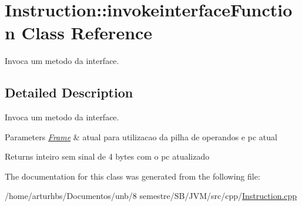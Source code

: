 \hypertarget{classInstruction_1_1invokeinterfaceFunction}{}\section{Instruction\+:\+:invokeinterface\+Function Class Reference}
\label{classInstruction_1_1invokeinterfaceFunction}


Invoca um metodo da interface.  




\subsection{Detailed Description}
Invoca um metodo da interface. 


\begin{DoxyParams}{Parameters}
{\em \hyperlink{classFrame}{Frame}} & atual para utilizacao da pilha de operandos e pc atual \\
\hline
\end{DoxyParams}
\begin{DoxyReturn}{Returns}
inteiro sem sinal de 4 bytes com o pc atualizado 
\end{DoxyReturn}


The documentation for this class was generated from the following file\+:\begin{DoxyCompactItemize}
\item 
/home/arturhbs/\+Documentos/unb/8 semestre/\+S\+B/\+J\+V\+M/src/cpp/\hyperlink{Instruction_8cpp}{Instruction.\+cpp}\end{DoxyCompactItemize}
